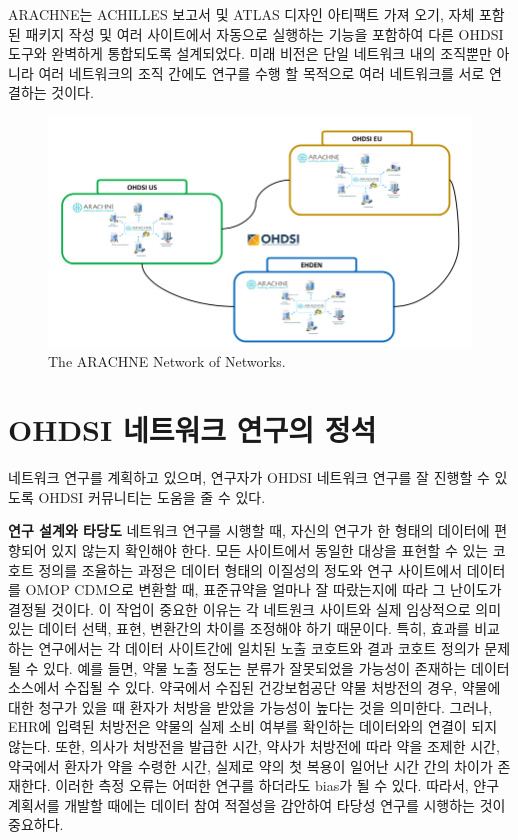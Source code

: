 \documentclass[11pt]{book}
\theoremstyle{definition}
\theoremstyle{definition}
\theoremstyle{definition}
\theoremstyle{remark}
\begin{document}
ARACHNE는 ACHILLES 보고서 및 ATLAS 디자인 아티팩트 가져 오기, 자체
포함된 패키지 작성 및 여러 사이트에서 자동으로 실행하는 기능을 포함하여
다른 OHDSI 도구와 완벽하게 통합되도록 설계되었다. 미래 비전은 단일
네트워크 내의 조직뿐만 아니라 여러 네트워크의 조직 간에도 연구를 수행 할
목적으로 여러 네트워크를 서로 연결하는 것이다.

\begin{figure}[h]

{\centering \includegraphics[width=0.9\linewidth]{images/NetworkStudies/ARACHNENON} 

}

\caption{The ARACHNE Network of Networks.}\label{fig:arachneNon}
\end{figure}

\section{OHDSI 네트워크 연구의 정석}\label{ohdsi---}


네트워크 연구를 계획하고 있으며, 연구자가 OHDSI 네트워크 연구를 잘
진행할 수 있도록 OHDSI 커뮤니티는 도움을 줄 수 있다.

\textbf{연구 설계와 타당도} 네트워크 연구를 시행할 때, 자신의 연구가 한
형태의 데이터에 편향되어 있지 않는지 확인해야 한다. 모든 사이트에서
동일한 대상을 표현할 수 있는 코호트 정의를 조율하는 과정은 데이터 형태의
이질성의 정도와 연구 사이트에서 데이터를 OMOP CDM으로 변환할 때,
표준규약을 얼마나 잘 따랐는지에 따라 그 난이도가 결정될 것이다. 이
작업이 중요한 이유는 각 네트원크 사이트와 실제 임상적으로 의미있는
데이터 선택, 표현, 변환간의 차이를 조정해야 하기 때문이다. 특히, 효과를
비교하는 연구에서는 각 데이터 사이트간에 일치된 노출 코호트와 결과
코호트 정의가 문제될 수 있다. 예를 들면, 약물 노출 정도는 분류가
잘못되었을 가능성이 존재하는 데이터 소스에서 수집될 수 있다. 약국에서
수집된 건강보험공단 약물 처방전의 경우, 약물에 대한 청구가 있을 때
환자가 처방을 받았을 가능성이 높다는 것을 의미한다. 그러나, EHR에 입력된
처방전은 약물의 실제 소비 여부를 확인하는 데이터와의 연결이 되지 않는다.
또한, 의사가 처방전을 발급한 시간, 약사가 처방전에 따라 약을 조제한
시간, 약국에서 환자가 약을 수령한 시간, 실제로 약의 첫 복용이 일어난
시간 간의 차이가 존재한다. 이러한 측정 오류는 어떠한 연구를 하더라도
bias가 될 수 있다. 따라서, 얀구 계획서를 개발할 때에는 데이터 참여
적절성을 감안하여 타당성 연구를 시행하는 것이 중요하다.
\end{document}

